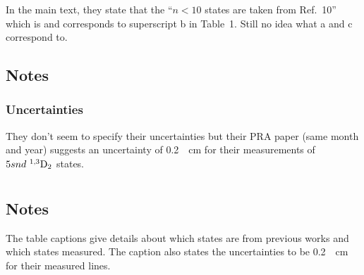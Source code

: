 \documentclass{article}
\newcommand{\tsup}{\textsuperscript}													%
\newcommand{\tsub}{\textsubscript}														%
\newcommand{\SLJ}[3]{\tsup{#1}\textnormal{#2}\tsub{#3}}
\newcommand{\nSLJ}[4]{{#1}\textnormal{ }\SLJ{#2}{#3}{#4}}
\begin{document}
In the main text, they state that the ``${n < 10}$ states are taken from Ref.~10'' which is \cite{moo_1952v2} and corresponds to superscript b in Table~1. Still no idea what a and c correspond to.

\subsection{Notes}

\subsubsection{Uncertainties}

They don't seem to specify their uncertainties but their PRA paper \cite{daz_1995} (same month and year) suggests an uncertainty of \SI{0.2}{\per\cm} for their measurements of $\nSLJ{5snd}{1,3}{D}{2}$ states. 

\section{}

\subsection{Notes}

The table captions give details about which states are from previous works and which states \citeauthor{dai_1995} measured. The caption also states the uncertainties to be \SI{0.2}{\per\cm} for their measured lines.

\printbibliography
\end{document}
